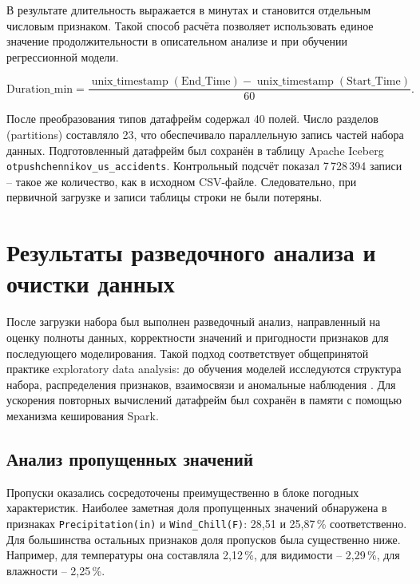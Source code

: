 В результате длительность выражается в минутах и становится отдельным числовым признаком. Такой способ расчёта позволяет использовать единое значение продолжительности в описательном анализе и при обучении регрессионной модели.

\begin{equation}
    \label{eq:duration}
    \text{Duration\_min} =
    \frac{\operatorname{unix\_timestamp}(\text{End\_Time}) -
    \operatorname{unix\_timestamp}(\text{Start\_Time})}{60}.
\end{equation}

После преобразования типов датафрейм содержал 40 полей. Число разделов (partitions) составляло 23, что обеспечивало параллельную запись частей набора данных. Подготовленный датафрейм был сохранён в таблицу Apache Iceberg \texttt{otpushchennikov\_us\_accidents}. Контрольный подсчёт показал 7\,728\,394 записи -- такое же количество, как в исходном CSV-файле. Следовательно, при первичной загрузке и записи таблицы строки не были потеряны.

\vspace{\baselineskip}
\section{Результаты разведочного анализа и очистки данных}
\vspace{\baselineskip}

После загрузки набора был выполнен разведочный анализ, направленный на оценку полноты данных, корректности значений и пригодности признаков для последующего моделирования. Такой подход соответствует общепринятой практике exploratory data analysis: до обучения моделей исследуются структура набора, распределения признаков, взаимосвязи и аномальные наблюдения \cite{feng2021exploration, koirala2020pyspark, kaggle2022pysparkeda}. Для ускорения повторных вычислений датафрейм был сохранён в памяти с помощью механизма кеширования Spark.

\vspace{\baselineskip}
\subsection{Анализ пропущенных значений}
\vspace{\baselineskip}

Пропуски оказались сосредоточены преимущественно в блоке погодных характеристик. Наиболее заметная доля пропущенных значений обнаружена в признаках \texttt{Precipitation(in)} и \texttt{Wind\_Chill(F)}: 28,51 и 25,87\,\% соответственно. Для большинства остальных признаков доля пропусков была существенно ниже. Например, для температуры она составляла 2,12\,\%, для видимости -- 2,29\,\%, для влажности -- 2,25\,\%.

